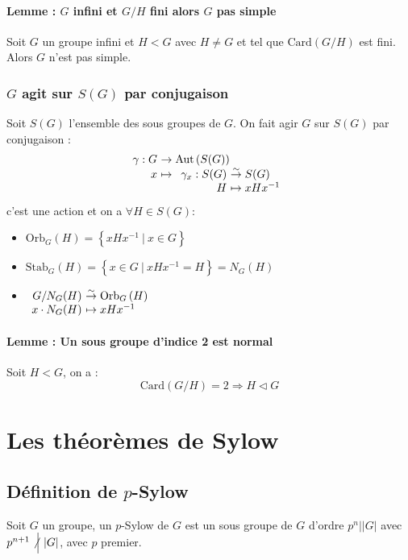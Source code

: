 \documentclass[a4paper,10pt]{report}
\newcommand{\set}[1]{\left\lbrace #1 \right\rbrace } %
\newcommand{\so}{\Rightarrow}
\newcommand{\bij}{\overset{\sim}{\to}} %
\newcommand{\Aut}[1]{\text{Aut}\left(#1\right)}
\newcommand{\Orb}[2]{\text{Orb}_{#1}\left( #2 \right)}
\newcommand{\Stab}[2]{\text{Stab}_{#1}\left( #2 \right)}
\newcommand{\Card}[1]{\text{Card}\left( #1 \right)}
\newcommand{\such}{\ \Big| \ }
\newcommand{\Nmid}{\not\Big| \ }
\begin{document}
    \subsubsection{Lemme : $G$ infini et $G/H$ fini alors $G$ pas simple}
     Soit $G$ un groupe infini et $H < G$ avec $H \neq G$ et tel que
     $\Card{G/H}$ est fini.\\
     Alors $G$ n'est pas simple.

   \subsection{$G$ agit sur $S(G)$ par conjugaison}
    Soit $S(G)$ l'ensemble des sous groupes de $G$. On fait agir $G$ sur $S(G)$
    par conjugaison :
    $$
    \begin{array}[t]{r@{\ }l}
      \gamma : G &\to \Aut{S(G)}\\
      x &\mapsto 
      \begin{array}[t]{r@{\ }l}
	\gamma_x : S(G) &\bij S(G) \\
	H &\mapsto xHx^{-1}
      \end{array}
    \end{array}$$
    c'est une action et on a $\forall H \in S(G)$:
    \begin{itemize}
      \item $\Orb{G}{H}=\set{xHx^{-1} \such x \in G}$
      \item $\Stab{G}{H}=\set{x\in G \such xHx^{-1}=H}=N_G(H)$
      \item $
	\begin{array}[t]{r@{\ }l}
	  G/N_G(H) &\bij \Orb{G}{H} \\
	  x \cdot N_G(H) &\mapsto xHx^{-1}
	\end{array}$
    \end{itemize}

    \subsubsection{Lemme : Un sous groupe d'indice 2 est normal}
     Soit $H < G$, on a :
     $$\Card{G/H}=2 \so H \triangleleft G$$

 \chapter{Les théorèmes de Sylow}
  \section{Définition de $p$-Sylow}
   Soit $G$ un groupe, un $p$-Sylow de $G$ est un sous groupe de $G$ d'ordre
   $p^n \Big| |G|$ avec $p^{n+1} \Nmid |G|$, avec $p$ premier.
\end{document}
